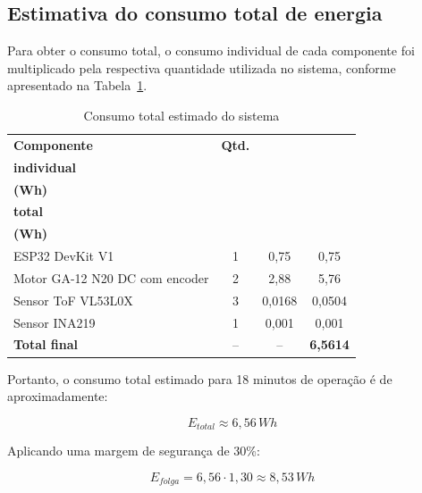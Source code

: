 \subsection{Estimativa do consumo total de energia}

Para obter o consumo total, o consumo individual de cada componente foi multiplicado pela respectiva quantidade utilizada no sistema, conforme apresentado na Tabela~\ref{tab:consumo-total}.

\begin{table}[htbp]
\centering
\caption{Consumo total estimado do sistema}
\label{tab:consumo-total}
\small
\setlength{\tabcolsep}{4pt}
\renewcommand{\arraystretch}{1.2}
\begin{tabularx}{\textwidth}{|>{\raggedright\arraybackslash}X|c|c|c|}
\hline
\textbf{Componente} 
& \textbf{Qtd.} 
& \shortstack{\textbf{Consumo}\\\textbf{individual}\\\textbf{(Wh)}} 
& \shortstack{\textbf{Consumo}\\\textbf{total}\\\textbf{(Wh)}} \\ \hline

ESP32 DevKit V1 
& 1 
& 0,75 
& 0,75 \\ \hline

Motor GA-12 N20 DC com encoder 
& 2 
& 2,88 
& 5,76 \\ \hline

Sensor ToF VL53L0X 
& 3 
& 0,0168 
& 0,0504 \\ \hline

Sensor INA219 
& 1 
& 0,001 
& 0,001 \\ \hline

\textbf{Total final} 
& -- 
& -- 
& \textbf{6,5614} \\ \hline

\end{tabularx}
\end{table}

Portanto, o consumo total estimado para 18 minutos de operação é de aproximadamente:

\begin{equation}
E_{total} \approx 6{,}56\,Wh
\end{equation}

Aplicando uma margem de segurança de 30\%:

\begin{equation}
E_{folga} = 6{,}56 \cdot 1{,}30 \approx 8{,}53\,Wh
\end{equation}



